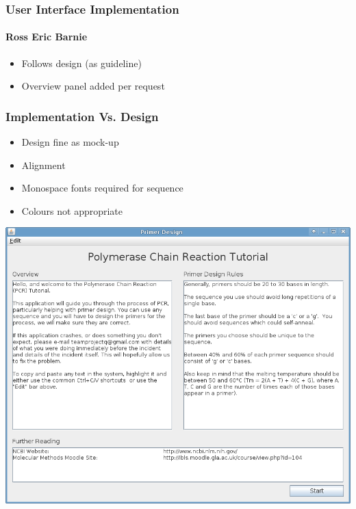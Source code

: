 
\begin{frame}
  \frametitle{User Interface Implementation}
  \framesubtitle{Ross Eric Barnie}
  \begin{itemize}
    \item{Follows design (as guideline)}
    \item{Overview panel added per request}
  \end{itemize}
\end{frame}

\begin{frame}
  \frametitle{Implementation Vs. Design}
  \begin{itemize}
    \item{Design fine as mock-up}
    \item{Alignment}
    \item{Monospace fonts required for sequence}
    \item{Colours not appropriate}
  \end{itemize}
\end{frame}

\begin{frame}
  \includegraphics[width=\textwidth]{./img/currentBuild/start.png}  
\end{frame}

